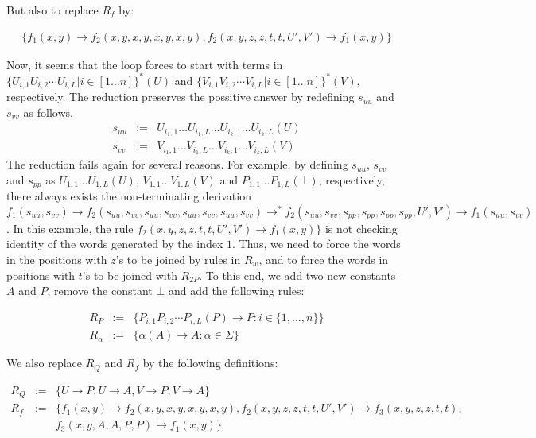 \documentclass{LMCS}
\theoremstyle{plain}
\begin{document}
{But also to replace $R_f$ by:

\begin{eqnarray*}
\{f_1(x,y)\rightarrow f_2(x,y,x,y,x,y,x,y),f_2(x,y,z,z,t,t,U',V')\rightarrow f_1(x,y)\}
\end{eqnarray*}

Now, it seems that the loop forces to start with terms
in $\{U_{i,1}U_{i,2}\cdots U_{i,L}|i\in[1\ldots n]\}^*(U)$
and $\{V_{i,1}V_{i,2}\cdots V_{i,L}|i\in[1\ldots n]\}^*(V)$,
respectively. The reduction preserves the possitive answer
by redefining $s_{uu}$ and $s_{vv}$ as follows.
\begin{eqnarray*}
 s_{uu} & := & U_{i_1,1}\ldots U_{i_1,L}\ldots U_{i_k,1}\ldots U_{i_k,L}(U)
\\
 s_{vv} & := & V_{i_1,1}\ldots V_{i_1,L}\ldots V_{i_k,1}\ldots V_{i_k,L}(V)
\end{eqnarray*}
The reduction fails again for several reasons. For example,
by defining $s_{uu}$, $s_{vv}$ and $s_{pp}$ as
$U_{1,1}\ldots U_{1,L}(U)$, $V_{1,1}\ldots V_{1,L}(V)$
and $P_{1,1}\ldots P_{1,L}(\bot)$,
respectively, there always exists the non-terminating derivation
$f_1(s_{uu},s_{vv})\to
f_2(s_{uu},s_{vv},s_{uu},s_{vv},s_{uu},s_{vv},s_{uu},s_{vv})
\to^* f_2(s_{uu},s_{vv},s_{pp},s_{pp},s_{pp},s_{pp},U',V')
\to f_1(s_{uu},s_{vv})$.
In this example, the rule $f_2(x,y,z,z,t,t,U',V')\rightarrow
f_1(x,y)\}$ is not checking identity of the words generated
by the index $1$. Thus, we need to force the words
in the positions with $z$'s to be joined by rules in $R_w$,
and to force the words in positions with $t$'s to be joined with
$R_{2P}$. To this end, we add two new constants $A$ and $P$,
remove the constant $\bot$ and add the following rules:

\begin{eqnarray*}
R_{P} & := & \{ P_{i,1}P_{i,2}\cdots P_{i,L}(P) \rightarrow P : i\in\{1,\ldots,n\}\}
\\
R_\alpha & := &  \{ \alpha(A)\rightarrow A: \alpha\in\Sigma \}
\end{eqnarray*}

We also replace $R_Q$ and $R_f$ by the following definitions:

\begin{eqnarray*}
R_{Q} & := & \{ U \rightarrow P, U \rightarrow A, V \rightarrow P, V \rightarrow A\}
\\
R_f & := & \{f_1(x,y)\rightarrow f_2(x,y,x,y,x,y,x,y), 
	f_2(x,y,z,z,t,t,U',V')\rightarrow f_3(x,y,z,z,t,t), 
	\\ & & 
	f_3(x,y,A,A,P,P)\rightarrow f_1(x,y) \}
\end{eqnarray*}

}
\end{document}
